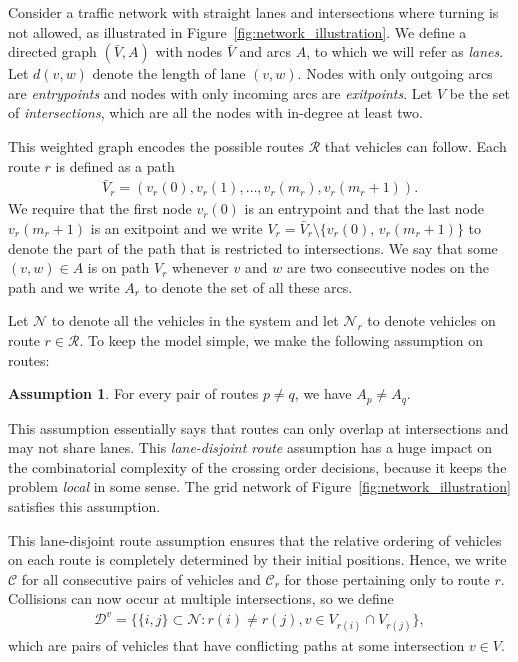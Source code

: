 \documentclass{report}
\theoremstyle{definition}
\newtheorem{assump}{Assumption}[chapter]
\theoremstyle{plain}
\begin{document}
Consider a traffic network with straight lanes and intersections where turning
is not allowed, as illustrated in Figure~\ref{fig:network_illustration}.
% 
We define a directed graph $(\bar{V},A)$ with nodes $\bar{V}$ and arcs $A$, to
which we will refer as \emph{lanes}. Let $d(v, w)$ denote the length of lane
$(v,w)$.
%
Nodes with only outgoing arcs are \textit{entrypoints} and nodes with only incoming arcs
are \textit{exitpoints}. Let $V$ be the set of \textit{intersections}, which are all the nodes
with in-degree at least two.

This weighted graph encodes the possible routes $\mathcal{R}$ that vehicles can
follow.
%
Each route $r$ is defined as a path
\begin{align*}
  \bar{V}_{r} = (v_{r}(0), v_{r}(1), \dots, v_{r}(m_{r}), v_{r}(m_{r}+1)) .
\end{align*}
We require that the first node $v_{r}(0)$ is an entrypoint and that the last
node $v_{r}(m_{r}+1)$ is an exitpoint and we write
$V_{r} = \bar{V}_{r} \setminus \{ v_{r}(0), \, v_{r}(m_{r}+1) \}$ to denote the part of
the path that is restricted to intersections.
%
We say that some $(v, w) \in A$ is on path $V_{r}$ whenever $v$ and $w$ are two
consecutive nodes on the path and we write $A_{r}$ to denote the set of all
these arcs.

Let $\mathcal{N}$ to denote all the vehicles in the system and let
$\mathcal{N}_r$ to denote vehicles on route $r \in \mathcal{R}$.
%
To keep the model simple, we make the following assumption on routes:

\begin{assump}\label{assump:lane-disjoint}
For every pair of routes $p \neq q$, we have $A_{p} \neq A_{q}$.
\end{assump}
%
This assumption essentially says that routes can only overlap at intersections
and may not share lanes.
%
This \emph{lane-disjoint route} assumption has a huge impact on the
combinatorial complexity of the crossing order decisions, because it keeps the
problem \emph{local} in some sense.
%
The grid network of Figure~\ref{fig:network_illustration} satisfies this assumption.

This lane-disjoint route assumption ensures that the relative ordering of
vehicles on each route is completely determined by their initial positions.
Hence, we write $\mathcal{C}$ for all consecutive pairs of vehicles and
$\mathcal{C}_r$ for those pertaining only to route $r$.
%
Collisions can now occur at multiple intersections, so we define
\begin{align}
  \label{eq:6}
  \mathcal{D}^v = \{ \{i, j\} \subset \mathcal{N} : r(i) \neq r(j) , v\in V_{r(i)} \cap V_{r(j)}\}  ,
\end{align}
which are pairs of vehicles that have conflicting paths at some intersection
$v \in V$.
\end{document}
